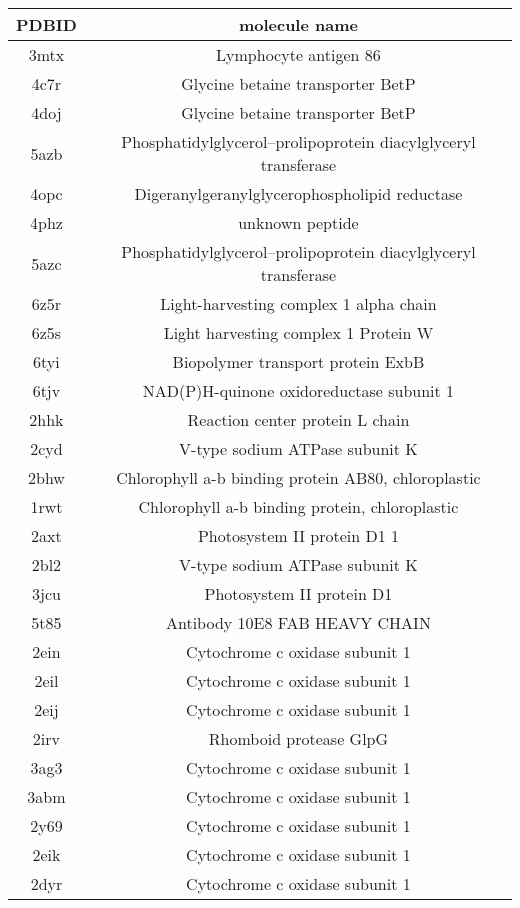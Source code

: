 \documentclass{article}
\begin{document}
\begin{table}[]
    \centering
    \begin{tabular}{c|c}
PDBID & molecule name \\
\hline
3mtx & Lymphocyte antigen 86 \\ 
4c7r & Glycine betaine transporter BetP \\ 
4doj & Glycine betaine transporter BetP \\ 
5azb & Phosphatidylglycerol--prolipoprotein diacylglyceryl transferase \\ 
4opc & Digeranylgeranylglycerophospholipid reductase \\ 
4phz & unknown peptide \\ 
5azc & Phosphatidylglycerol--prolipoprotein diacylglyceryl transferase \\ 
6z5r & Light-harvesting complex 1 alpha chain \\ 
6z5s & Light harvesting complex 1 Protein W \\ 
6tyi & Biopolymer transport protein ExbB \\ 
6tjv & NAD(P)H-quinone oxidoreductase subunit 1 \\ 
2hhk & Reaction center protein L chain \\ 
2cyd & V-type sodium ATPase subunit K \\ 
2bhw & Chlorophyll a-b binding protein AB80, chloroplastic \\ 
1rwt & Chlorophyll a-b binding protein, chloroplastic \\ 
2axt & Photosystem II protein D1 1 \\ 
2bl2 & V-type sodium ATPase subunit K \\ 
3jcu & Photosystem II protein D1 \\ 
5t85 & Antibody 10E8 FAB HEAVY CHAIN \\ 
2ein & Cytochrome c oxidase subunit 1 \\ 
2eil & Cytochrome c oxidase subunit 1 \\ 
2eij & Cytochrome c oxidase subunit 1 \\ 
2irv & Rhomboid protease GlpG \\ 
3ag3 & Cytochrome c oxidase subunit 1 \\ 
3abm & Cytochrome c oxidase subunit 1 \\ 
2y69 & Cytochrome c oxidase subunit 1 \\ 
2eik & Cytochrome c oxidase subunit 1 \\ 
2dyr & Cytochrome c oxidase subunit 1 \\ 

\end{tabular}
\end{table}
\end{document}
